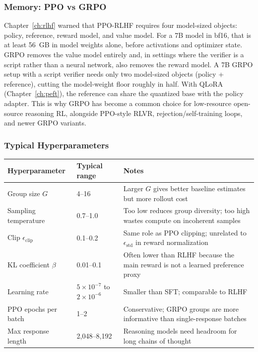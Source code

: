 \subsubsection*{Memory: PPO vs GRPO}

Chapter~\ref{ch:rlhf} warned that PPO-RLHF requires four model-sized objects: policy, reference, reward model, and value model. For a 7B model in bf16, that is at least 56~GB in model weights alone, before activations and optimizer state. GRPO removes the value model entirely and, in settings where the verifier is a script rather than a neural network, also removes the reward model. A 7B GRPO setup with a script verifier needs only two model-sized objects (policy + reference), cutting the model-weight floor roughly in half. With QLoRA (Chapter~\ref{ch:peft}), the reference can share the quantized base with the policy adapter. This is why GRPO has become a common choice for low-resource open-source reasoning RL, alongside PPO-style RLVR, rejection/self-training loops, and newer GRPO variants.

\subsubsection*{Typical Hyperparameters}

\begin{center}
\small
\begin{tabularx}{\textwidth}{@{}l l X@{}}
\toprule
\textbf{Hyperparameter} & \textbf{Typical range} & \textbf{Notes} \\
\midrule
Group size $G$ & 4--16 & Larger $G$ gives better baseline estimates but more rollout cost \\
Sampling temperature & 0.7--1.0 & Too low reduces group diversity; too high wastes compute on incoherent samples \\
Clip $\epsilon_{\text{clip}}$ & 0.1--0.2 & Same role as PPO clipping; unrelated to $\epsilon_{\text{std}}$ in reward normalization \\
KL coefficient $\beta$ & 0.01--0.1 & Often lower than RLHF because the main reward is not a learned preference proxy \\
Learning rate & $5 \times 10^{-7}$ to $2 \times 10^{-6}$ & Smaller than SFT; comparable to RLHF \\
PPO epochs per batch & 1--2 & Conservative; GRPO groups are more informative than single-response batches \\
Max response length & 2{,}048--8{,}192 & Reasoning models need headroom for long chains of thought \\
\bottomrule
\end{tabularx}
\normalsize
\end{center}

